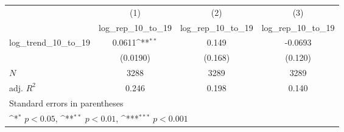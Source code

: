 {
\def\sym#1{\ifmmode^{#1}\else\(^{#1}\)\fi}
\begin{tabular}{l*{3}{c}}
\hline\hline
            &\multicolumn{1}{c}{(1)}&\multicolumn{1}{c}{(2)}&\multicolumn{1}{c}{(3)}\\
            &\multicolumn{1}{c}{log\_rep\_10\_to\_19}&\multicolumn{1}{c}{log\_rep\_10\_to\_19}&\multicolumn{1}{c}{log\_rep\_10\_to\_19}\\
\hline
log\_trend\_10\_to\_19&      0.0611\sym{**} &       0.149         &     -0.0693         \\
            &    (0.0190)         &     (0.168)         &     (0.120)         \\
\hline
\(N\)       &        3288         &        3289         &        3289         \\
adj. \(R^{2}\)&       0.246         &       0.198         &       0.140         \\
\hline\hline
\multicolumn{4}{l}{\footnotesize Standard errors in parentheses}\\
\multicolumn{4}{l}{\footnotesize \sym{*} \(p<0.05\), \sym{**} \(p<0.01\), \sym{***} \(p<0.001\)}\\
\end{tabular}
}
